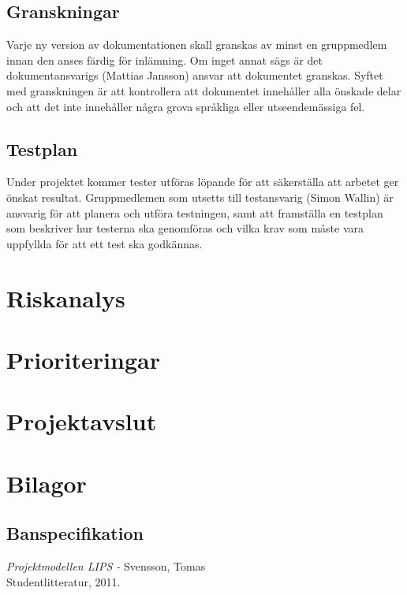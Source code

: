 \documentclass[a4paper,12pt]{article}
\begin{document}
\subsection{Granskningar}
Varje ny version av dokumentationen skall granskas av minst en gruppmedlem innan den anses färdig för inlämning. Om inget annat sägs är det dokumentansvarigs (Mattias Jansson) ansvar att dokumentet granskas. Syftet med granskningen är att kontrollera att dokumentet innehåller alla önskade delar och att det inte innehåller några grova språkliga eller utseendemässiga fel.
\subsection{Testplan}
Under projektet kommer tester utföras löpande för att säkerställa att arbetet ger önskat resultat. Gruppmedlemen som utsetts till testansvarig (Simon Wallin) är ansvarig för att planera och utföra testningen, samt att framställa en testplan som beskriver hur testerna ska genomföras och vilka krav som måste vara uppfyllda för att ett test ska godkännas.


\section{Riskanalys} %

\section{Prioriteringar}


\section{Projektavslut} %


\newpage
\appendix
\section{Bilagor} \label{app:rules}


\subsection{Banspecifikation} \label{app:bana}

\newpage


\begin{thebibliography}{99}
\textit{Projektmodellen LIPS - } Svensson, Tomas
\\Studentlitteratur, 2011.
\end{thebibliography}
\end{document}
